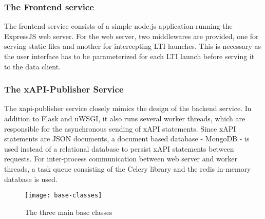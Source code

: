     \subsubsection{The Frontend service}
        The frontend service consists of a simple node.js
        application running the ExpressJS web server. For the
        web server, two middlewares are provided, one for
        serving static files and another for intercepting LTI launches.
        This is necessary as the user interface has to be
        parameterized for each LTI launch before serving it to the data client.

    \subsubsection{The xAPI-Publisher Service}
        The xapi-publisher service closely mimics the design of the
        backend service. In addition to Flask and uWSGI,
        it also runs several worker threads, which are responsible for the
        asynchronous sending of xAPI statements. Since xAPI statements
        are JSON documents, a document based database - MongoDB - is used instead
        of a relational database to persist xAPI statements between requests.
        For inter-process communication between web server and
        worker threads, a task queue consisting of the Celery library
        and the redis in-memory database is used.

        \begin{wrapfigure}{o}{.5\textwidth}
            \centering
            \texttt{[image: base-classes]}
            \caption{The three main base classes}
            \label{fig:base-classes-dia}
        \end{wrapfigure}

